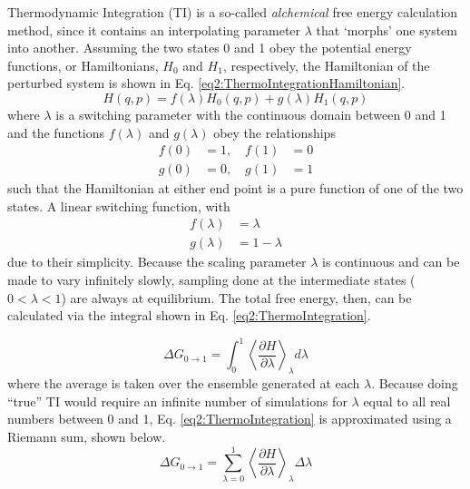Thermodynamic Integration (TI) is a so-called \emph{alchemical} free energy
calculation method, since it contains an interpolating parameter $\lambda$ that
`morphs' one system into another. \cite{Leach_Book_MolModel_2001,
Tuckerman_Book_StatMech_TheoryAndSim} Assuming the two states 0 and 1 obey the
potential energy functions, or Hamiltonians, $H_0$ and $H_1$, respectively, the
Hamiltonian of the perturbed system is shown in Eq.
\ref{eq2:ThermoIntegrationHamiltonian}.
\begin{equation}
   H(q,p) = f(\lambda) H_0(q,p) + g(\lambda) H_1(q,p)
   \label{eq2:ThermoIntegrationHamiltonian}
\end{equation}
where $\lambda$ is a switching parameter with the continuous domain between 0
and 1 and the functions $f(\lambda)$ and $g(\lambda)$ obey the relationships
\begin{eqnarray*}
   f(0) & = 1,\quad f(1) & = 0 \\
   g(0) & = 0,\quad g(1) & = 1
\end{eqnarray*}
such that the Hamiltonian at either end point is a pure function of one of the
two states. A linear switching function, with
\begin{eqnarray*}
   f(\lambda) & = \lambda \\
   g(\lambda) & = 1 - \lambda
\end{eqnarray*}
due to their simplicity. Because the scaling parameter $\lambda$ is continuous
and can be made to vary infinitely slowly, sampling done at the intermediate
states (\ie $0 < \lambda < 1$) are always at equilibrium. The total free energy,
then, can be calculated via the integral shown in Eq.
\ref{eq2:ThermoIntegration}. \cite{Leach_Book_MolModel_2001}

\begin{equation}
   \Delta G_{0 \rightarrow 1} = \int _ 0 ^ 1 \left \langle \frac {\partial H}
         {\partial \lambda} \right \rangle _ {\lambda} d\lambda
   \label{eq2:ThermoIntegration}
\end{equation}
where the average is taken over the ensemble generated at each $\lambda$.
Because doing ``true'' TI would require an infinite number of simulations for
$\lambda$ equal to all real numbers between 0 and 1, Eq.
\ref{eq2:ThermoIntegration} is approximated using a Riemann sum, shown below.
\begin{equation*}
   \Delta G_{0 \rightarrow 1} = \sum _ {\lambda = 0} ^ 1 \left \langle \frac
         {\partial H} {\partial \lambda} \right \rangle _ {\lambda} \Delta
         \lambda
\end{equation*}

